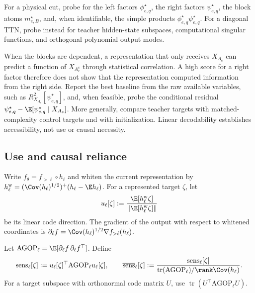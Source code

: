 For a physical cut, probe for the left factors $\phi_{e,q}^\star$, the right factors
$\psi_{e,q}^\star$, the block atoms $m_{e,B}^\star$, and, when identifiable, the simple products
$\phi_{e,q}^\star\psi_{e,q}^\star$.  For a diagonal TTN, probe instead for teacher hidden-state
subspaces, computational singular functions, and orthogonal polynomial output modes.

\begin{remark}\label{rem:probe-meaning}
When the blocks are dependent, a representation that only receives $X_{A_e}$ can predict a function
of $X_{A_e^c}$ through statistical correlation.  A high score for a right factor therefore does not
show that the representation computed information from the right side.  Report the best baseline
from the raw available variables, such as $R^2_{X_{A_e}}[\psi_{e,q}^\star]$, and, when feasible,
probe the conditional residual
$\psi_{e,q}^\star-\E[\psi_{e,q}^\star\mid X_{A_e}]$.  More generally, compare teacher targets with
matched-complexity control targets and with initialization.  Linear decodability establishes
accessibility, not use or causal necessity.
\end{remark}

\subsection{Use and causal reliance}\label{sec:use}

Write $f_\theta=f_{>\ell}\circ h_\ell$ and whiten the current representation by
$h_\ell^{\mathrm w}=(\Cov(h_\ell)^{1/2})^+(h_\ell-\E h_\ell)$.  For a represented target $\zeta$,
let
\[
 u_\ell[\zeta]
 :=\frac{\E[h_\ell^{\mathrm w}\zeta]}{\|\E[h_\ell^{\mathrm w}\zeta]\|}
\]
be its linear code direction.  The gradient of the output with respect to whitened coordinates is
$\partial_\ell f=\Cov(h_\ell)^{1/2}\nabla f_{>\ell}(h_\ell)$.

\begin{definition}\label{def:sensitivity}
Let $\mathrm{AGOP}_\ell=\E[\partial_\ell f\,\partial_\ell f^\top]$.  Define
\[
 \operatorname{sens}_\ell[\zeta]
 :=u_\ell[\zeta]^\top\mathrm{AGOP}_\ell u_\ell[\zeta],
 \qquad
 \overline{\operatorname{sens}}_\ell[\zeta]
 :=\frac{\operatorname{sens}_\ell[\zeta]}
 {\operatorname{tr}(\mathrm{AGOP}_\ell)/\rank\Cov(h_\ell)}.
\]
For a target subspace with orthonormal code matrix $U$, use
$\operatorname{tr}(U^\top\mathrm{AGOP}_\ell U)$.
\end{definition}

